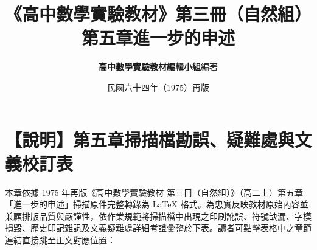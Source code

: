 \documentclass[a4paper,12pt,twoside]{article}
\title{\LARGE\textbf{《高中數學實驗教材》第三冊（自然組）}\\[0.5em] \Large\textbf{第五章\quad 進一步的申述}}
\author{\textbf{高中數學實驗教材編輯小組}\quad 編著}
\date{民國六十四年（1975）再版}
\begin{document}
\maketitle
\thispagestyle{firstpage}

\section*{【說明】第五章掃描檔勘誤、疑難處與文義校訂表}
\label{sec:errata_notes_b3_ch5}
\label{sec:current_errata}

本章依據 1975 年再版《高中數學實驗教材 第三冊（自然組）》（高二上）第五章「進一步的申述」掃描原件完整轉錄為 \LaTeX{} 格式。為忠實反映教材原始內容並兼顧排版品質與嚴謹性，依作業規範將掃描檔中出現之印刷訛誤、符號缺漏、字模損毀、歷史印記雜訊及文義疑難處詳細考證彙整於下表。讀者可點擊表格中之章節連結直接跳至正文對應位置：
\end{document}
